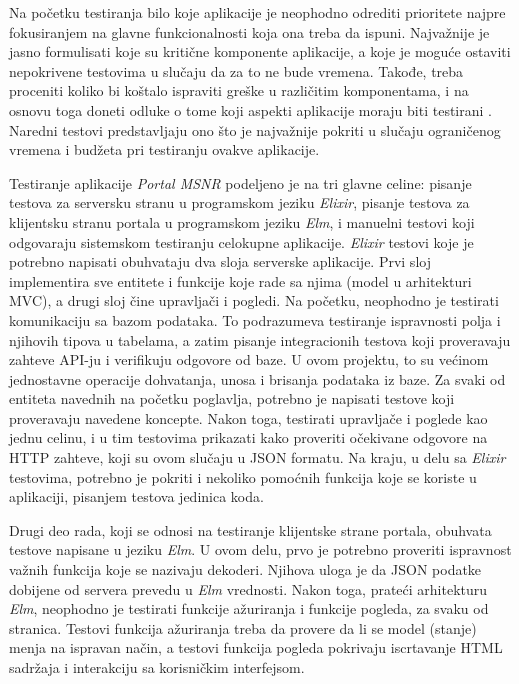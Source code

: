 \documentclass[12pt,oneside]{memoir}
\begin{document}
\par Na početku testiranja bilo koje aplikacije je neophodno odrediti prioritete najpre fokusiranjem na glavne funkcionalnosti koja ona treba da ispuni. Najvažnije je jasno formulisati koje su kritične komponente aplikacije, a koje je moguće ostaviti nepokrivene testovima u slučaju da za to ne bude vremena. Takođe, treba proceniti koliko bi koštalo ispraviti greške u različitim komponentama, i na osnovu toga doneti odluke o tome koji aspekti aplikacije moraju biti testirani \cite{stlc, est}. Naredni testovi predstavljaju ono što je najvažnije pokriti u slučaju ograničenog vremena i budžeta pri testiranju ovakve aplikacije. 
\par Testiranje aplikacije \emph{Portal MSNR} podeljeno je na tri glavne celine: pisanje testova za serversku stranu u programskom jeziku \emph{Elixir}, pisanje testova za klijentsku stranu portala u programskom jeziku \emph{Elm}, i manuelni testovi koji odgovaraju sistemskom testiranju celokupne aplikacije. \emph{Elixir} testovi koje je potrebno napisati obuhvataju dva sloja serverske aplikacije. Prvi sloj implementira sve entitete i funkcije koje rade sa njima (model u arhitekturi MVC), a drugi sloj čine upravljači i pogledi. Na početku, neophodno je testirati komunikaciju sa bazom podataka. To podrazumeva testiranje ispravnosti polja i njihovih tipova u tabelama, a zatim pisanje integracionih testova koji proveravaju zahteve API-ju i verifikuju odgovore od baze. U ovom projektu, to su većinom jednostavne operacije dohvatanja, unosa i brisanja podataka iz baze. Za svaki od entiteta navednih na početku poglavlja, potrebno je napisati testove koji proveravaju navedene koncepte. Nakon toga, testirati upravljače i poglede kao jednu celinu, i u tim testovima prikazati kako proveriti očekivane odgovore na HTTP zahteve, koji su ovom slučaju u JSON formatu. Na kraju, u delu sa \emph{Elixir} testovima, potrebno je pokriti i nekoliko pomoćnih funkcija koje se koriste u aplikaciji, pisanjem testova jedinica koda.
\par Drugi deo rada, koji se odnosi na testiranje klijentske strane portala, obuhvata testove napisane u jeziku \emph{Elm}. U ovom delu, prvo je potrebno proveriti ispravnost važnih funkcija koje se nazivaju dekoderi. Njihova uloga je da JSON podatke dobijene od servera prevedu u \emph{Elm} vrednosti. Nakon toga, prateći arhitekturu \emph{Elm}, neophodno je testirati funkcije ažuriranja i funkcije pogleda, za svaku od stranica. Testovi funkcija ažuriranja treba da provere da li se model (stanje) menja na ispravan način, a testovi funkcija pogleda pokrivaju iscrtavanje HTML sadržaja i interakciju sa korisničkim interfejsom.
\end{document}
